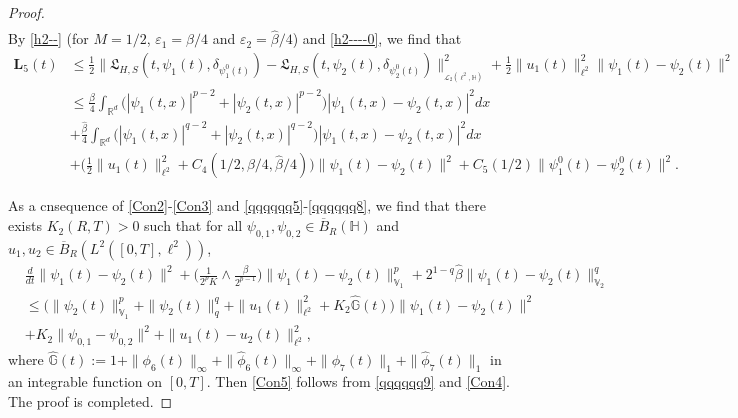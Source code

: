 \documentclass[11pt]{article}
\renewcommand{\leq}{\leqslant}
\numberwithin{equation}{section}
\begin{document}
\begin{proof}
\begin{align}
\end{align}
By \eqref{h2--} (for $M=1/2$, $\varepsilon_1=\beta/4$ and
$\varepsilon_2=\widehat{\beta}/4$) and \eqref{h2----0}, we find that
\begin{align}\label{qqqqqq8}
\textbf{L}_5(t)&\leq
\frac{1}{2}\| \mathfrak{L}_{H,S}(t,\psi_1(t),
\delta_{\psi^0_1(t)})-\mathfrak{L}_{H,S}(t,\psi_2(t),
\delta_{\psi^0_2(t)})
\|_{_{\mathcal{L}_2(\ell^2
 ,\mathbb{H})}}^2+\frac{1}{2}
\|u_1(t)\|_{\ell^2}^2\|\psi_1(t)-\psi_2(t) \|^2
\nonumber\\&\leq\frac{\beta}{4} \int_{\mathbb{R}^d}  \big(|\psi_1(t,x)|^{p-2}+|\psi_2(t,x)|^{p-2}\big)
|\psi_1(t,x)-\psi_2(t,x)|^2dx
\nonumber\\& +\frac{\widehat{\beta}}{4} \int_{\mathbb{R}^d}  \big(|\psi_1(t,x)|^{q-2}+|\psi_2(t,x)|^{q-2}\big)
|\psi_1(t,x)-\psi_2(t,x)|^2dx
\nonumber\\&+\bigg(\frac{1}{2}
\|u_1(t)\|_{\ell^2}^2+C_4(1/2,\beta/4,
\widehat{\beta}/4)
\bigg)\|\psi_1(t)-\psi_2(t) \|^2
+C_5(1/2)\|\psi_1^0(t)-\psi_2^0(t) \|^2 .
\end{align}

As a cnsequence of \eqref{Con2}-\eqref{Con3}
 and \eqref{qqqqqq5}-\eqref{qqqqqq8}, we find that there exists $K_2(R, T)>0$ such that
for all $\psi_{0,1},\psi_{0,2}\in \overline{B}_{R}(\mathbb{H})$ and
$u_1,u_2\in \overline{B}_{R}(L^2([0,T],\ell^2))$,
\begin{align}\label{qqqqqq9}	& \frac{d}{dt}\|\psi_1(t)-
\psi_2(t)\|^2+\Big(\frac{1}{2^pK}\wedge\frac{\beta}{2^{p-1}}
\Big)\|\psi_1(t)-
\psi_2(t)\|^p_{\mathbb{V}_1}
+2^{1-q}\widehat{\beta}
\|\psi_1(t)-\psi_2(t)\|_{\mathbb{V}_2}^{q}
\nonumber\\&
 \leq \big(\| \psi_2(t)\|_{\mathbb{V}_1}^p+
\| \psi_2(t)\|_{q}^{q}+\|u_1(t)\|_{\ell^2}^2+
K_2\widehat{\mathbb{G}}(t)\big)\|\psi_1(t)-\psi_2(t) \|^2
\nonumber\\&
+
K_2 \|\psi_{0,1} -\psi_{0,2}
 \|^2
+\|u_1(t)-u_2(t)\|_{\ell^2}^2,
\end{align}
where
$\widehat{\mathbb{G}}(t):=1 +
\|\phi_6(t)\|_{\infty}
+\|\widehat{\phi}_6(t)\|_{\infty}
+
  \| \phi_7(t)\|_1
+ \| \widehat{\phi}_7(t)\|_1
 $ in an integrable function
on $[0,T]$. Then \eqref{Con5} follows from
\eqref{qqqqqq9} and \eqref{Con4}. The proof is completed.
\end{proof}
\end{document}
